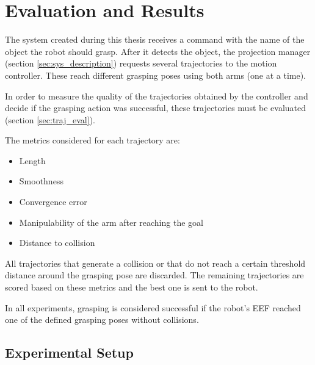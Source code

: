 

\chapter{\textbf{Evaluation and Results}}

The system created during this thesis receives a command with the name of the object the robot should grasp. After it detects the object, the projection manager (section \ref{sec:sys_description}) requests several trajectories to the motion controller. These reach different grasping poses using both arms (one at a time).

In order to measure the quality of the trajectories obtained by the controller and decide if the grasping action was successful, these trajectories must be evaluated (section \ref{sec:traj_eval}).

The metrics considered for each trajectory are:
\begin{itemize}
	\item Length
	\item Smoothness
	\item Convergence error
	\item Manipulability of the arm after reaching the goal
	\item Distance to collision
\end{itemize}

All trajectories that generate a collision or that do not reach a certain threshold distance around the grasping pose are discarded. The remaining trajectories are scored based on these metrics and the best one is sent to the robot.

In all experiments, grasping is considered successful if the robot's EEF reached one of the defined grasping poses without collisions.

\section{Experimental Setup}

